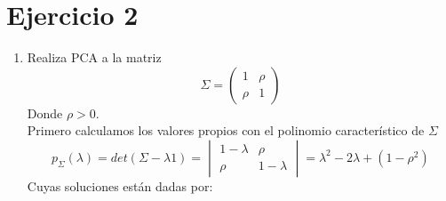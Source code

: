 \documentclass[paper=letter, fontsize=11pt]{scrartcl}
\numberwithin{equation}{section} %
\numberwithin{figure}{section} %
\numberwithin{table}{section} %
\begin{document}
\section{Ejercicio 2}
\begin{enumerate}
\item Realiza PCA a la matriz\\
\[
\Sigma = \begin{pmatrix}
			1 & \rho \\
            \rho & 1 \end{pmatrix}
\]
Donde $\rho > 0$.\\
Primero calculamos los valores propios con el polinomio característico de $\Sigma$\\
\[
p_{\Sigma}(\lambda) = det(\Sigma - \lambda 1) = \begin{vmatrix}
			1 - \lambda & \rho \\
            \rho & 1 -\lambda \end{vmatrix} =\lambda^2 -2\lambda+(1-\rho^2)
\]
Cuyas soluciones están dadas por:


\end{enumerate}
\end{document}
